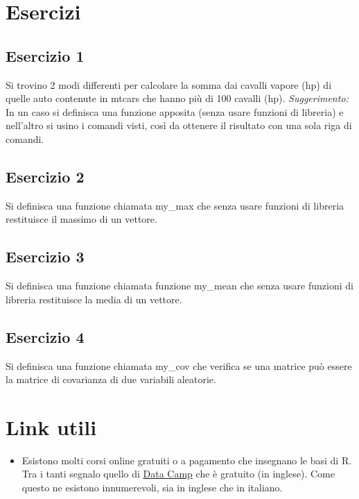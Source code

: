 \documentclass[]{book}
\providecommand{\tightlist}{%
  \setlength{\itemsep}{0pt}\setlength{\parskip}{0pt}}
\begin{document}
\hypertarget{esercizi}{%
\section{Esercizi}\label{esercizi}}

\hypertarget{esercizio-1}{%
\subsection{Esercizio 1}\label{esercizio-1}}

Si trovino 2 modi differenti per calcolare la somma dai cavalli vapore (hp) di quelle auto contenute in mtcars che hanno più di 100 cavalli (hp).
\emph{Suggerimento:} In un caso si definisca una funzione apposita (senza usare funzioni di libreria) e nell'altro si usino i comandi visti, così da ottenere il risultato con una sola riga di comandi.

\hypertarget{esercizio-2}{%
\subsection{Esercizio 2}\label{esercizio-2}}

Si definisca una funzione chiamata my\_max che senza usare funzioni di libreria restituisce il massimo di un vettore.

\hypertarget{esercizio-3}{%
\subsection{Esercizio 3}\label{esercizio-3}}

Si definisca una funzione chiamata funzione my\_mean che senza usare funzioni di libreria restituisce la media di un vettore.

\hypertarget{esercizio-4}{%
\subsection{Esercizio 4}\label{esercizio-4}}

Si definisca una funzione chiamata my\_cov che verifica se una matrice può essere la matrice di covarianza di due variabili aleatorie.

\hypertarget{link-utili-1}{%
\section{Link utili}\label{link-utili-1}}

\begin{itemize}
\tightlist
\item
  Esistono molti corsi online gratuiti o a pagamento che insegnano le basi di R. Tra i tanti segnalo quello di \href{https://www.datacamp.com/courses/free-introduction-to-r}{Data Camp} che è gratuito (in inglese). Come questo ne esistono innumerevoli, sia in inglese che in italiano.
\end{itemize}
\end{document}

